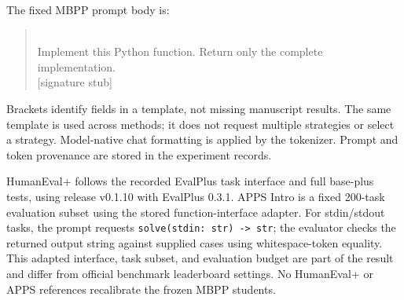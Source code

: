\documentclass{article}
\begin{document}
The fixed MBPP prompt body is:
\begin{quote}\small{}\\[3pt]
Implement this Python function. Return only the complete implementation.\\
{[signature stub]}
\end{quote}
Brackets identify fields in a template, not missing manuscript results. The same template is used across methods; it does not request multiple strategies or select a strategy. Model-native chat formatting is applied by the tokenizer. Prompt and token provenance are stored in the experiment records.

HumanEval+ follows the recorded EvalPlus task interface and full base-plus tests, using release v0.1.10 with EvalPlus 0.3.1. APPS Intro is a fixed 200-task evaluation subset using the stored function-interface adapter. For stdin/stdout tasks, the prompt requests \texttt{solve(stdin: str) -> str}; the evaluator checks the returned output string against supplied cases using whitespace-token equality. This adapted interface, task subset, and evaluation budget are part of the result and differ from official benchmark leaderboard settings. No HumanEval+ or APPS references recalibrate the frozen MBPP students.
\end{document}
